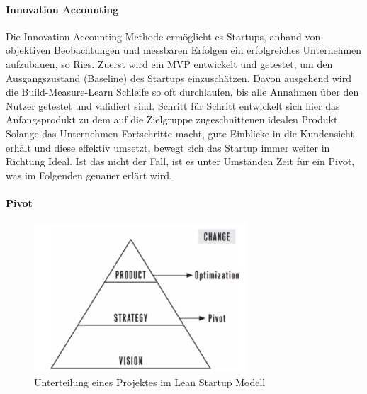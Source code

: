 
\paragraph{Innovation Accounting}
Die Innovation Accounting Methode ermöglicht es Startups, anhand von objektiven Beobachtungen und messbaren Erfolgen ein erfolgreiches Unternehmen aufzubauen, so Ries. Zuerst wird ein MVP entwickelt und getestet, um den Ausgangszustand (Baseline) des Startups einzuschätzen. Davon ausgehend wird die Build-Measure-Learn Schleife so oft durchlaufen, bis alle Annahmen über den Nutzer getestet und validiert sind. Schritt für Schritt entwickelt sich hier das Anfangsprodukt zu dem auf die Zielgruppe zugeschnittenen idealen Produkt. Solange das Unternehmen Fortschritte macht, gute Einblicke in die Kundensicht erhält und diese effektiv umsetzt, bewegt sich das Startup immer weiter in Richtung Ideal. Ist das nicht der Fall, ist es unter Umständen Zeit für ein Pivot, was im Folgenden genauer erlärt wird.

\paragraph{Pivot}

\begin{figure}
	\begin{center}
		\includegraphics[scale=1]{99_IMG/02_Grundlagen/visionStrategyProduct.png}
		\caption{Unterteilung eines Projektes im Lean Startup Modell}
		\label{LeanStartup_VisionStrategyProduct}
	\end{center}
\end{figure}

